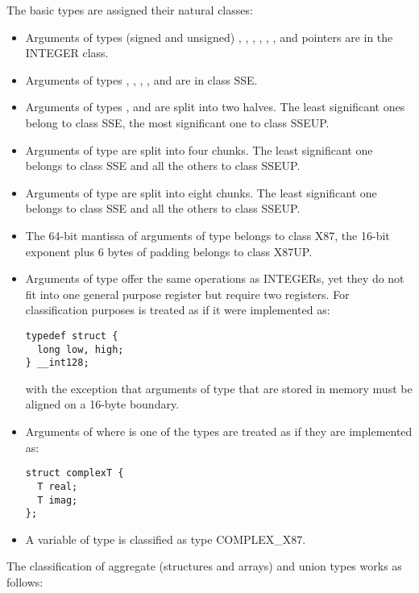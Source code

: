 The basic types are assigned their natural classes:
\begin{itemize}
\item Arguments of types (signed and unsigned) , ,
  , , , , and
  pointers are in the INTEGER class.
\item Arguments of types , , ,
  ,
   and  are in class SSE.
\item Arguments of types , 
  and  are split into two halves.  The least significant
  ones belong to class SSE, the most significant one to class SSEUP.
\item Arguments of type  are split into four \eightbyte
  chunks.  The least significant one belongs to class SSE and all the
  others to class SSEUP.
\item Arguments of type  are split into eight \eightbyte
  chunks.  The least significant one belongs to class SSE and all the
  others to class SSEUP.
\item The 64-bit mantissa of arguments of type 
  belongs to class X87, the 16-bit exponent plus 6 bytes of padding
  belongs to class X87UP.
\item Arguments of type  offer the same operations as
INTEGERs, yet they do not fit into one general purpose register but
require two registers.  For
classification purposes  is treated as if it
were implemented as:
\begin{verbatim}
typedef struct {
  long low, high;
} __int128;
\end{verbatim}
with the exception that arguments of type  that are
stored in memory must be aligned on a 16-byte boundary.

\item Arguments of  where  is one of the types
   are treated as if they are
  implemented as:
\begin{verbatim}
struct complexT {
  T real;
  T imag;
};
\end{verbatim}
\item A variable of type  is classified as
  type COMPLEX\_X87.
\end{itemize}


The classification of aggregate (structures and arrays) and union
types works as follows:

